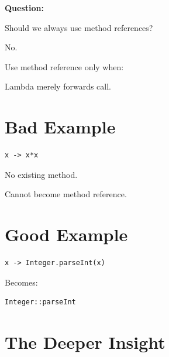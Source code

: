 \documentclass[11pt,a4paper]{book}
\begin{document}
\textbf{Question:}

Should we always use
method references?


No.


Use method reference only when:


Lambda merely forwards call.


\section{Bad Example}

\begin{verbatim} 
x -> x*x
\end{verbatim}


No existing method.


Cannot become method reference.


\section{Good Example}

\begin{verbatim} 
x -> Integer.parseInt(x)
\end{verbatim}


Becomes:

\begin{verbatim} 
Integer::parseInt
\end{verbatim}


\section{The Deeper Insight}
\end{document}

